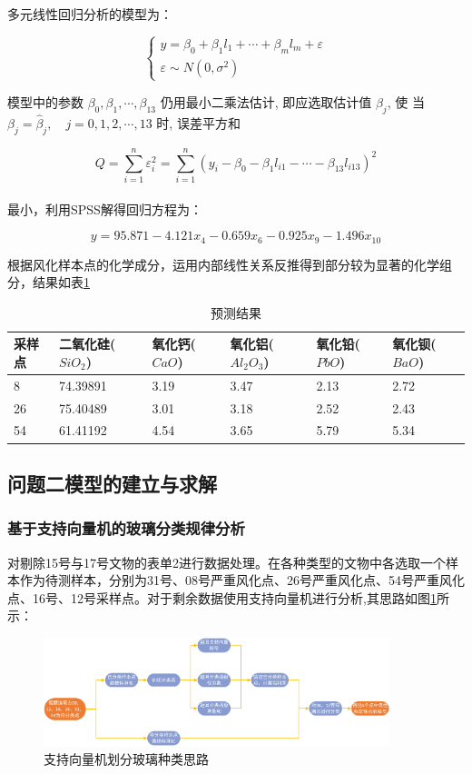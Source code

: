\documentclass{my_paper}
\begin{document}
多元线性回归分析\cite{司守奎2011数学建模算法与应用}的模型为：

$$\left\{\begin{array}{l}
y=\beta_{0}+\beta_{1} l_{1}+\cdots+\beta_{m} l_{m}+\varepsilon \\
\varepsilon \sim N\left(0, \sigma^{2}\right)
\end{array}\right.$$

模型中的参数 $ \beta_{0}, \beta_{1}, \cdots, \beta_{13} $ 仍用最小二乘法估计, 即应选取估计值  $\beta_{j} $, 使 当 $\beta_{j}=\hat{\beta}_{j}, \quad j=0,1,2, \cdots, 13 $ 时, 误差平方和

$$Q=\sum_{i=1}^{n} \varepsilon_{i}^{2}=\sum_{i=1}^{n}\left(y_{i}-\beta_{0}-\beta_{1} l_{i 1}-\cdots-\beta_{13} l_{i 13}\right)^{2}$$ \\
最小，利用SPSS解得回归方程为：

$$ y= 95.871-4.121 x_4-0.659x_6-0.925x_9-1.496x_{10}$$

根据风化样本点的化学成分，运用内部线性关系反推得到部分较为显著的化学组分，结果如表\ref{预测}

\begin{table}[H]
    \centering
    \begin{tabular}{llllll}
    \hline
        采样点 & 二氧化硅($SiO_2$) & 氧化钙($CaO$) & 氧化铝($Al_2O_3$) & 氧化铅($PbO$) & 氧化钡($BaO$) \\ \hline
        8 & 74.39891 & 3.19 & 3.47 & 2.13 & 2.72 \\ 
        26 & 75.40489 & 3.01 & 3.18 & 2.52 & 2.43 \\ 
        54 & 61.41192 & 4.54 & 3.65 & 5.79 & 5.34 \\ \hline
    \end{tabular}
    \caption{预测结果}
    \label{预测}
\end{table}

\subsection{问题二模型的建立与求解}
\subsubsection{基于支持向量机的玻璃分类规律分析}
对剔除15号与17号文物的表单2进行数据处理。在各种类型的文物中各选取一个样本作为待测样本，分别为31号、08号严重风化点、26号严重风化点、54号严重风化点、16号、12号采样点。对于剩余数据使用支持向量机进行分析,其思路如图\ref{向量机}所示：
\begin{figure}[H]
    \centering
    \includegraphics[width=0.9\textwidth]{支持向量机思路.jpg}
    \caption{支持向量机划分玻璃种类思路}
    \label{向量机}
\end{figure}
\end{document}
